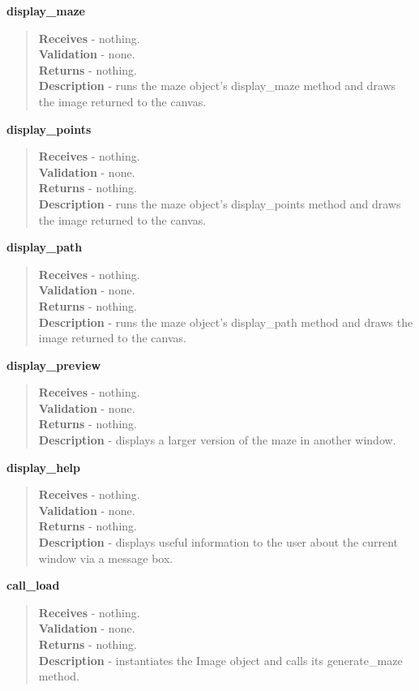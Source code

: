\documentclass[titlepage]{article}
\begin{document}
\textbf{display\_maze}
\begin{quote}
\textbf{Receives} - nothing. \\
\textbf{Validation} - none.\\
\textbf{Returns} - nothing. \\
\textbf{Description} - runs the maze object's display\_maze method and draws the image returned to the canvas.
\end{quote}

\textbf{display\_points}
\begin{quote}
\textbf{Receives} - nothing. \\
\textbf{Validation} - none.\\
\textbf{Returns} - nothing. \\
\textbf{Description} - runs the maze object's display\_points method and draws the image returned to the canvas.
\end{quote}

\textbf{display\_path}
\begin{quote}
\textbf{Receives} - nothing. \\
\textbf{Validation} - none.\\
\textbf{Returns} - nothing. \\
\textbf{Description} - runs the maze object's  display\_path method and draws the image returned to the canvas.
\end{quote}

\textbf{display\_preview}
\begin{quote}
\textbf{Receives} - nothing. \\
\textbf{Validation} - none.\\
\textbf{Returns} - nothing. \\
\textbf{Description} - displays a larger version of the maze in another window.
\end{quote}

\textbf{display\_help}
\begin{quote}
\textbf{Receives} - nothing. \\
\textbf{Validation} - none.\\
\textbf{Returns} - nothing. \\
\textbf{Description} - displays useful information to the user about the current window via a message box.
\end{quote}

\textbf{call\_load}
\begin{quote}
\textbf{Receives} - nothing. \\
\textbf{Validation} - none.\\
\textbf{Returns} - nothing. \\
\textbf{Description} - instantiates the Image object and calls its generate\_maze method.
\end{quote}
\end{document}
